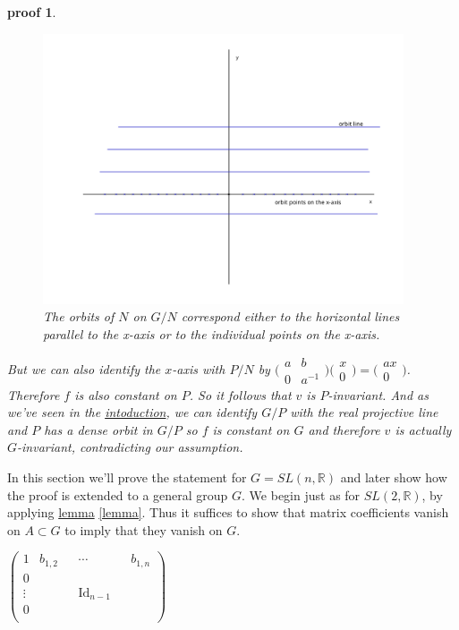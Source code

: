 \documentclass[
  12pt
]{article}
\theoremstyle{break}
\theoremstyle{plain}
\newtheorem*{pf}{proof}
\newcommand{\G}{\ensuremath{G}}
\newcommand{\sltr}{\ensuremath{SL(2, \mathbb{R})}}
\newcommand{\slnr}{\ensuremath{SL(n, \mathbb{R})}}
\newcommand{\ipmatrix}[1]{%
\ensuremath{\big(\begin{smallmatrix} #1 \end{smallmatrix}\big)}}
\DeclareMathOperator{\Id}{Id}
\begin{document}
\begin{pf}
    \begin{figure}
      \begin{center}
        \includegraphics[width=0.95\textwidth]{N-orbits-in-R2-1.png}
      \end{center}
      \caption{The orbits of $N$ on $G/N$ correspond either to the horizontal lines parallel to the x-axis or to the individual points on the x-axis. }
      \label{fig:n-orbits-in-r2}
    \end{figure}

    But we can also identify the $x$-axis with $P/N$ by $\ipmatrix{a & b \\ 0 &
    a^{-1}}\ipmatrix{x \\ 0} = \ipmatrix{ax \\ 0}$. Therefore $f$ is also
    constant on $P$. So it follows that $v$ is $P$-invariant. And as we've seen
    in the \hyperref[sec:introduction]{intoduction}, we can identify $G/P$ with
    the real projective line and $P$ has a dense orbit in $G/P$ so $f$ is
    constant on $G$ and therefore $v$ is actually \G-invariant, contradicting our
    assumption.
  \end{pf}




  In this section we'll prove the statement for $G = \slnr$ and later show how
  the proof is extended to a general group \G. We begin just as for \sltr, by
  applying \hyperref[lemma]{lemma} \ref{lemma}. Thus it suffices to show that
  matrix coefficients vanish on $A \subset G$ to imply that they vanish on \G.


  \begin{math}
    \begin{pmatrix}
      1 & b_{1,2} & & \cdots & & b_{1,n} \\
      0 & & &  & \\
      \vdots & & & \Id_{n-1} & \\
      0 & & & & \\
    \end{pmatrix}
  \end{math}
\end{document}
